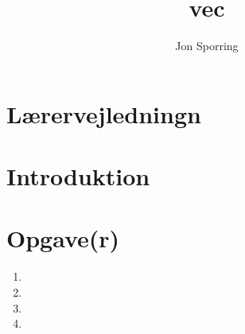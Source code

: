 \documentclass[a4paper,12pt]{article}
\title{vec}
\author{Jon Sporring}
\begin{document}
\maketitle

\section{Lærervejledningn}

\section{Introduktion}

\section{Opgave(r)}
\begin{enumerate}
\item 
\item 
\item 
\item 
\end{enumerate}
\end{document}
